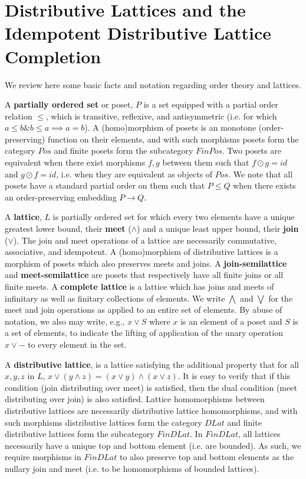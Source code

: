 \documentclass[hoptionsi,review,format=acmsmall]{acmart}
\theoremstyle{definition}
\newcommand{\band}{\mathbin{\&}}
\begin{document}
\section{Distributive Lattices and the Idempotent Distributive Lattice Completion}

We review here some basic facts and notation regarding order theory and lattices.

A \textbf{partially ordered set} or poset, \(P\) is a set equipped with a partial order relation \(\le\), which is transitive,  reflexive, and antisymmetric (i.e. for which \( a \le b \band b \le a \implies a = b\)). A (homo)morphism of posets is an monotone (order-preserving) function on their elements, and with such morphisms posets form the category \(Pos\) and finite posets form the subcategory \(FinPos\). Two posets are equivalent when there exist morphisms \(f, g\) between them such that \(f \odot g = id\) and \(g \odot f = id\), i.e. when they are equivalent as objects of \(Pos\). We note that all posets have a standard partial order on them such that \(P \le Q\) when there exists an order-preserving embedding \(P \rightarrow Q\).

A \textbf{lattice}, \(L\) is partially ordered set for which every two elements have a unique greatest lower bound, their \textbf{meet} (\(\wedge\)) and a unique least upper bound, their \textbf{join} (\(\vee\)). The join and meet operations of a lattice are necessarily commutative, associative, and idempotent. A (homo)morphism of distributive lattices is a morphism of posets which also preserves meets and joins. A \textbf{join-semilattice} and \textbf{meet-semilattice} are posets that respectively have all finite joins or all finite meets. A \textbf{complete lattice} is a lattice which has joins and meets of infinitary as well as finitary collections of elements. We write \(\bigwedge\) and \(\bigvee\) for the meet and join operations as applied to an entire set of elements. By abuse of notation, we also may write, e.g., \(x \vee S\) where \(x\) is an element of a poset and \(S\) is a set of elements, to indicate the lifting of application of the unary operation \(x \vee -\) to every element in the set.

A \textbf{distributive lattice}, is a lattice satisfying the additional property that for all \(x, y, z\) in \(L\), \(x \vee (y \wedge z) = (x \vee y) \wedge (x \vee z)\). It is easy to verify that if this condition (join distributing over meet) is satisfied, then the dual condition (meet distributing over join) is also satisfied.  Lattice homomorphisms between distributive lattices are necessarily distributive lattice homomorphisms, and with such morphisms distributive lattices form the category \(DLat\) and finite distributive lattices form the subcategory \(FinDLat\). In \(FinDLat\), all lattices necessarily have a unique top and bottom element (i.e. are bounded). As such, we require morphisms in \(FinDLat\) to also preserve top and bottom elements as the nullary join and meet (i.e. to be homomorphisms of bounded lattices).
\end{document}
